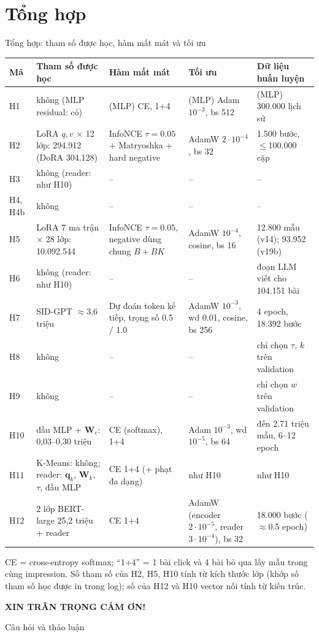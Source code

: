 \documentclass[aspectratio=169,t]{beamer}
\begin{document}
\section{Tổng hợp}
\begin{frame}[shrink]{Tổng hợp: tham số được học, hàm mất mát và tối ưu}
\tiny
\renewcommand{\arraystretch}{1.1}
\setlength{\tabcolsep}{2.5pt}
\begin{tabularx}{\textwidth}{@{}P{0.55cm}P{3.1cm}P{3.1cm}P{2.0cm}Y@{}}
\toprule
\textbf{Mã} & \textbf{Tham số được học} & \textbf{Hàm mất mát} & \textbf{Tối ưu} & \textbf{Dữ liệu huấn luyện}\\
\midrule
H1 & không (MLP residual: có) & (MLP) CE, 1+4 & (MLP) Adam $10^{-3}$, bs 512 & (MLP) 300.000 lịch sử\\
H2 & LoRA $q,v$ $\times$ 12 lớp: 294.912 (DoRA 304.128) & InfoNCE $\tau{=}0.05$ + Matryoshka + hard negative & AdamW $2\cdot10^{-4}$, bs 32 & 1.500 bước, $\le$100.000 cặp\\
H3 & không (reader: như H10) & -- & -- & --\\
H4, H4b & không & -- & -- & --\\
H5 & LoRA 7 ma trận $\times$ 28 lớp: 10.092.544 & InfoNCE $\tau{=}0.05$, negative dùng chung $B{+}BK$ & AdamW $10^{-4}$, cosine, bs 16 & 12.800 mẫu (v14); 93.952 (v19b)\\
H6 & không (reader: như H10) & -- & -- & đoạn LLM viết cho 104.151 bài\\
H7 & SID-GPT $\approx$3,6 triệu & Dự đoán token kế tiếp, trọng số 0.5 / 1.0 & AdamW $10^{-3}$, wd 0.01, cosine, bs 256 & 4 epoch, 18.392 bước\\
H8 & không & -- & -- & chỉ chọn $\tau$, $k$ trên validation\\
H9 & không & -- & -- & chỉ chọn $w$ trên validation\\
H10 & đầu MLP + $\mathbf W_c$: 0,03--0,30 triệu & CE (softmax), 1+4 & Adam $10^{-3}$, wd $10^{-5}$, bs 64 & đến 2.71 triệu mẫu, 6--12 epoch\\
H11 & K-Means: không; reader: $\mathbf q_k$, $\mathbf W_k$, $\tau$, đầu MLP & CE 1+4 (+ phạt đa dạng) & như H10 & như H10\\
H12 & 2 lớp BERT-large 25,2 triệu + reader & CE 1+4 & AdamW (encoder $2\cdot10^{-5}$, reader $3\cdot10^{-4}$), bs 32 & 18.000 bước ($\approx$0.5 epoch)\\
\bottomrule
\end{tabularx}
\par\vspace{3pt}
{\footnotesize CE = cross-entropy softmax; ``1+4'' = 1 bài click và 4 bài bỏ qua lấy mẫu trong cùng impression. Số tham số của H2, H5, H10 tính từ kích thước lớp (khớp số tham số học được in trong log); số của H12 và H10 vector nối tính từ kiến trúc.}
\par\kern0pt
\end{frame}

\begin{frame}[c,noframenumbering]
\centering
{\Huge\bfseries\color{accentc}XIN TRÂN TRỌNG CẢM ƠN!\par}
\vspace{0.5cm}
{\large Câu hỏi và thảo luận\par}
\par\kern0pt
\end{frame}
\end{document}
